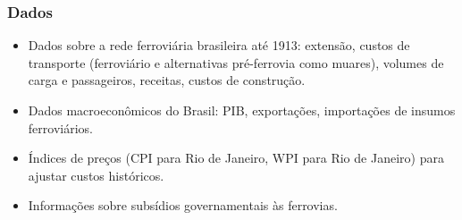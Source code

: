 \documentclass[12pt]{article}
\begin{document}
\subsubsection*{Dados}
\begin{itemize}
    \item Dados sobre a rede ferroviária brasileira até 1913: extensão, custos de transporte (ferroviário e alternativas pré-ferrovia como muares), volumes de carga e passageiros, receitas, custos de construção.
    \item Dados macroeconômicos do Brasil: PIB, exportações, importações de insumos ferroviários.
    \item Índices de preços (CPI para Rio de Janeiro, WPI para Rio de Janeiro) para ajustar custos históricos.
    \item Informações sobre subsídios governamentais às ferrovias.
\end{itemize}
\end{document}
